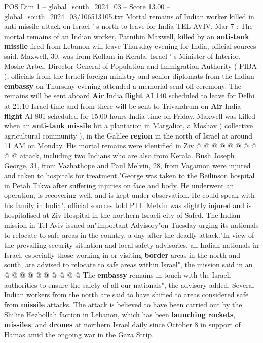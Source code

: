 \begin{textsample}{POS Dim 1 – global\_south\_2024\_03 – Score 13.00 – global\_south\_2024\_03/106513105.txt}  \label{ex:f1_pos_346}
Mortal remains of Indian worker killed in anti-missile attack on Israel ' s north to leave for India TEL AVIV, Mar 7 : The mortal remains of an Indian worker, Patnibin Maxwell, killed by an \textbf{anti-tank} \textbf{missile} fired from Lebanon will leave Thursday evening for India, official sources said.
Maxwell, 30, was from Kollam in Kerala.
Israel ' s Minister of Interior, Moshe Arbel, Director General of Population and Immigration Authority ( PIBA ), officials from the Israeli foreign ministry and senior diplomats from the Indian \textbf{embassy} on Thursday evening attended a memorial send-off ceremony.
The remains will be sent aboard \textbf{Air} India \textbf{flight} AI 140 scheduled to leave for Delhi at 21:10 Israel time and from there will be sent to Trivandrum on \textbf{Air} India \textbf{flight} AI 801 scheduled for 15:00 hours India time on Friday.
Maxwell was killed when an \textbf{anti-tank} \textbf{missile} hit a plantation in Margaliot, a Moshav ( collective agricultural community ), in the Galilee \textbf{region} in the north of Israel at around 11 AM on Monday.
His mortal remains were identified in Ziv @ @ @ @ @ @ @ @ @ @ attack, including two Indians who are also from Kerala.
Bush Joseph George, 31, from Vazhathope and Paul Melvin, 28, from Vagamon were injured and taken to hospitals for treatment."George was taken to the Beilinson hospital in Petah Tikva after suffering injuries on face and body.
He underwent an operation, is recovering well, and is kept under observation.
He could speak with his family in India", official sources told PTI.
Melvin was slightly injured and is hospitalised at Ziv Hospital in the northern Israeli city of Safed.
The Indian mission in Tel Aviv issued an"important Advisory"on Tuesday urging its nationals to relocate to safe areas in the country, a day after the deadly attack."In view of the prevailing security situation and local safety advisories, all Indian nationals in Israel, especially those working in or visiting \textbf{border} areas in the north and south, are advised to relocate to safe areas within Israel", the mission said in an @ @ @ @ @ @ @ @ @ @ The \textbf{embassy} remains in touch with the Israeli authorities to ensure the safety of all our nationals", the advisory added.
Several Indian workers from the north are said to have shifted to areas considered safe from \textbf{missile} attacks.
The attack is believed to have been carried out by the Shi'ite Hezbollah faction in Lebanon, which has been \textbf{launching} \textbf{rockets}, \textbf{missiles}, and \textbf{drones} at northern Israel daily since October 8 in support of Hamas amid the ongoing war in the Gaza Strip.

\end{textsample}
